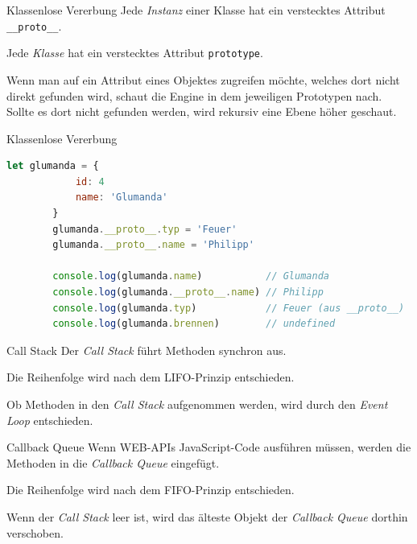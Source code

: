 \begin{bonus}{Klassenlose Vererbung}
    Jede \emph{Instanz} einer Klasse hat ein verstecktes Attribut \texttt{\_\_proto\_\_}.

    Jede \emph{Klasse} hat ein verstecktes Attribut \texttt{prototype}.

    Wenn man auf ein Attribut eines Objektes zugreifen möchte, welches dort nicht direkt gefunden wird, schaut die Engine in dem jeweiligen Prototypen nach.
    Sollte es dort nicht gefunden werden, wird rekursiv eine Ebene höher geschaut.
\end{bonus}

\begin{example}{Klassenlose Vererbung}
    \begin{lstlisting}[language=JavaScript]
        let glumanda = {
            id: 4
            name: 'Glumanda'
        }
        glumanda.__proto__.typ = 'Feuer'
        glumanda.__proto__.name = 'Philipp'

        console.log(glumanda.name)           // Glumanda
        console.log(glumanda.__proto__.name) // Philipp
        console.log(glumanda.typ)            // Feuer (aus __proto__)
        console.log(glumanda.brennen)        // undefined
    \end{lstlisting}
\end{example}

\begin{defi}{Call Stack}
    Der \emph{Call Stack} führt Methoden synchron aus.

    Die Reihenfolge wird nach dem LIFO-Prinzip entschieden.

    Ob Methoden in den \emph{Call Stack} aufgenommen werden, wird durch den \emph{Event Loop} entschieden.
\end{defi}

\begin{defi}{Callback Queue}
    Wenn WEB-APIs JavaScript-Code ausführen müssen, werden die Methoden in die \emph{Callback Queue} eingefügt.

    Die Reihenfolge wird nach dem FIFO-Prinzip entschieden.

    Wenn der \emph{Call Stack} leer ist, wird das älteste Objekt der \emph{Callback Queue} dorthin verschoben.
\end{defi}


